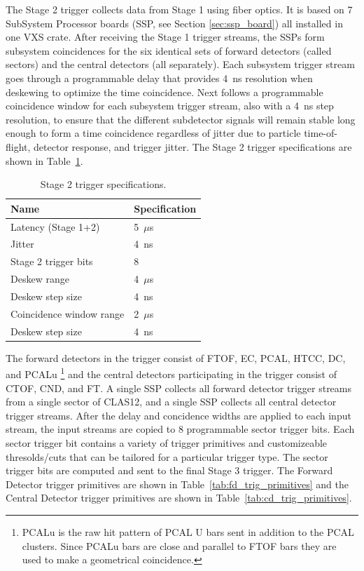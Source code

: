 The Stage 2 trigger collects data from Stage 1 using fiber optics. It is based on 7 SubSystem Processor boards (SSP, see Section \ref*{sec:ssp_board}) all installed in one VXS crate. After receiving the Stage 1 trigger streams, the SSPs form subsystem coincidences for the six identical sets of forward detectors (called sectors) and the central detectors (all separately). Each subsystem trigger stream goes through a programmable delay that provides 4~ns resolution when deskewing to optimize the time coincidence. Next follows a programmable coincidence window for each subsystem trigger stream, also with a 4~ns step resolution, to ensure that the different subdetector signals will remain stable long enough to form a time coincidence regardless of jitter due to particle time-of-flight, detector response, and trigger jitter. The Stage 2 trigger specifications are shown in Table~\ref{tab:stage_2_specs}.

\begin{table}
\begin{center}
	\begin{tabular}{| l | l |}
		\hline \hline
		Name				& Specification	\\
		\hline
		Latency (Stage 1+2)		& 5~$\mu$s	\\
		Jitter				& 4~ns		\\
		Stage 2 trigger bits		& 8		\\
		Deskew range			& 4~$\mu$s	\\
		Deskew step size		& 4~ns	\\
		Coincidence window range	& 2~$\mu$s	\\
		Deskew step size		& 4~ns	\\
		\hline \hline
	\end{tabular}
\end{center}
\caption{Stage 2 trigger specifications.}
\label{tab:stage_2_specs}
\end{table}

The forward detectors in the trigger consist of FTOF, EC, PCAL, HTCC, DC, and PCALu \footnote{PCALu is the raw hit pattern of PCAL U bars sent in addition to the PCAL clusters. Since PCALu bars are close and parallel to FTOF bars they are used to make a geometrical coincidence.} and the central detectors participating in the trigger consist of CTOF, CND, and FT. A single SSP collects all forward detector trigger streams from a single sector of CLAS12, and a single SSP collects all central detector trigger streams. After the delay and concidence widths are applied to each input stream, the input streams are copied to 8 programmable sector trigger bits. Each sector trigger bit contains a variety of trigger primitives and customizeable thresolds/cuts that can be tailored for a particular trigger type. The sector trigger bits are computed and sent to the final Stage 3 trigger. The Forward Detector trigger primitives are shown in Table~\ref{tab:fd_trig_primitives} and the Central Detector trigger primitives are shown in Table~\ref{tab:cd_trig_primitives}.

